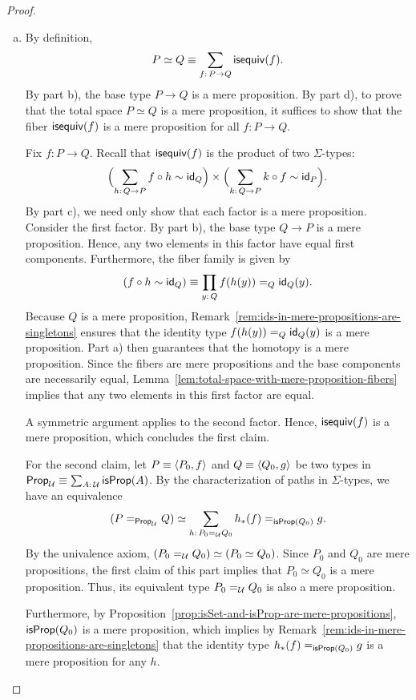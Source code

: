\begin{proof}
\begin{enumerate}[a)]
        \item By definition,
        \[
            P\simeq Q\equiv\sum_{f\colon P\to Q}\fun{isequiv}(f).
        \]
        By part b), the base type $P\to Q$ is a mere proposition. By part d), to prove that the total space $P\simeq Q$ is a mere proposition, it suffices to show that the fiber $\mathsf{isequiv}(f)$ is a mere proposition for all $f\colon P\to Q$.
        
        Fix $f\colon P\to Q$. Recall that $\mathsf{isequiv}(f)$ is the product of two $\Sigma$-types:
        \[
            \Bigl(\sum_{h\colon Q\to P}f\circ h\sim\id_Q\Bigr)
            \times
            \Bigl(\sum_{k\colon Q\to P}k\circ f\sim\id_P\Bigr).
        \]
        By part c), we need only show that each factor is a mere proposition. Consider the first factor. By part b), the base type $Q\to P$ is a mere proposition. Hence, any two elements in this factor have equal first components. Furthermore, the fiber family is given by
        \[
            (f\circ h\sim\id_Q)\equiv\prod_{y\colon Q}f(h(y))\eq{Q}\id_Q(y).
        \]
        Because $Q$ is a mere proposition, Remark~\ref{rem:ids-in-mere-propositions-are-singletons} ensures that the identity type $f(h(y))\mathrel{=_{Q}}\mathsf{id}_Q(y)$ is a mere proposition. Part a) then guarantees that the homotopy is a mere proposition. Since the fibers are mere propositions and the base components are necessarily equal, Lemma~\ref{lem:total-space-with-mere-proposition-fibers} implies that any two elements in this first factor are equal.
        
        A symmetric argument applies to the second factor. Hence, $\mathsf{isequiv}(f)$ is a mere proposition, which concludes the first claim.

        \bigskip

        For the second claim, let $P\equiv\langle P_0,f\rangle$ and $Q\equiv\langle Q_0,g\rangle$ be two types in $\fun{Prop}_\univ\equiv\sum_{A\colon\univ}\fun{isProp}(A)$. By the characterization of paths in $\Sigma$-types, we have an equivalence
        \[
            (P\eq{\fun{Prop}_\univ}Q)\simeq\sum_{h\colon P_0\eq{\univ}Q_0}h_*(f)\eq{\fun{isProp}(Q_0)}g.
        \]
        By the univalence axiom, $(P_0\mathrel{=_{\mathcal U}}Q_0)\simeq(P_0\simeq Q_0)$. Since $P_0$ and $Q_0$ are mere propositions, the first claim of this part implies that $P_0\simeq Q_0$ is a mere proposition. Thus, its equivalent type $P_0\mathrel{=_{\mathcal U}}Q_0$ is also a mere proposition.
        
        Furthermore, by Proposition~\ref{prop:isSet-and-isProp-are-mere-propositions}, $\mathsf{isProp}(Q_0)$ is a mere proposition, which implies by Remark~\ref{rem:ids-in-mere-propositions-are-singletons} that the identity type $h_*(f)\mathrel{=_{\mathsf{isProp}(Q_0)}}g$ is a mere proposition for any $h$.
        

\end{enumerate}
\end{proof}
